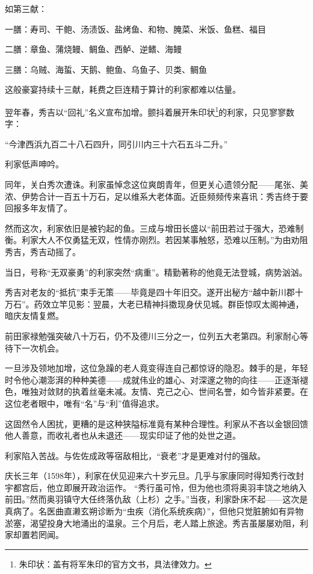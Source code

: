 \documentclass[
]{book}
\begin{document}
如第三献：

一膳：寿司、干鲍、汤渍饭、盐烤鱼、和物、腌菜、米饭、鱼糕、福目

二膳：章鱼、蒲烧鳗、鲷鱼、西鲈、逆鳍、海鳗

三膳：乌贼、海蜇、天鹅、鲍鱼、乌鱼子、贝类、鲷鱼

这般豪宴持续十三献，耗费之巨连精于算计的利家都难以估量。

翌年春，秀吉以``回礼''名义宣布加增。颤抖着展开朱印状\footnote{朱印状：盖有将军朱印的官方文书，具法律效力。}的利家，只见寥寥数字：

``今津西浜九百二十八石四升，同引川内三十六石五斗二升。''

利家低声呻吟。

同年，关白秀次遭诛。利家虽悼念这位爽朗青年，但更关心遗领分配------尾张、美浓、伊势合计一百五十万石，足以维系大老体面。近臣频频传来喜讯：秀吉终于要回报多年友情了。

然而这次，利家依旧是被钓起的鱼。三成与增田长盛以``前田若过于强大，恐难制衡。利家大人不仅勇猛无双，性情亦刚烈。若因某事触怒，恐难以压制。''为由劝阻秀吉，秀吉动摇了。

当日，号称``无双豪勇''的利家突然``病重''。精勤著称的他竟无法登城，病势汹汹。

秀吉对老友的``抵抗''束手无策------毕竟是四十年旧交。遂开出秘方``越中新川郡十万石''。药效立竿见影：翌晨，大老已精神抖擞现身伏见城。群臣惊叹太阁神通，暗庆友情复燃。

前田家禄勉强突破八十万石，仍不及德川三分之一，位列五大老第四。利家耐心等待下一次机会。

一旦涉及领地加增，这位急躁的老人竟变得连自己都惊讶的隐忍。棘手的是，年轻时令他心潮澎湃的种种美德------成就伟业的雄心、对深邃之物的向往------正逐渐褪色，唯独对敛财的执着丝毫未减。友情、克己之心、世间名誉，如今皆非紧要。在这位老者眼中，唯有``名''与``利''值得追求。

这固然令人困扰，更糟的是这种狭隘标准竟有某种合理性。利家从不吝以金银回馈他人善意，而收礼者也从未退还------现实印证了他的处世之道。

利家陷入苦战。与佐佐成政等宿敌相比，``衰老''才是更难对付的强敌。

庆长三年（1598年），利家在伏见迎来六十岁元旦。几乎与家康同时得知秀行改封宇都宫后，他立即展开政治运作。
``秀行虽可怜，但为他也须将奥羽丰饶之地纳入前田。''然而奥羽镇守大任终落仇敌（上杉）之手。''当夜，利家卧床不起------这次是真病了。名医曲直濑玄朔诊断为``虫疾（消化系统疾病）''，但他只觉脏腑如有异物淤塞，渴望投身大地涌出的温泉。三个月后，老人踏上旅途。秀吉虽屡屡劝阻，利家却置若罔闻。
\end{document}
